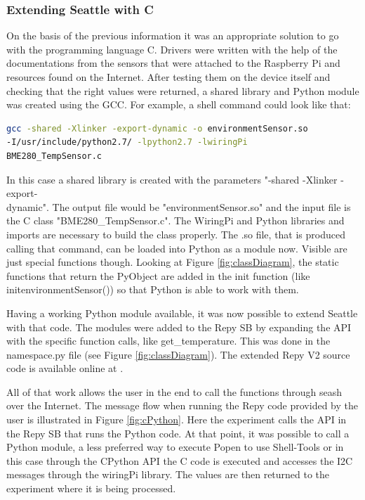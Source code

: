 \documentclass[bachelorthesis, grey, english]{mas-thesis-chapters} %
\begin{document}
\subsubsection{Extending Seattle with C}

On the basis of the previous information it was an appropriate solution to 
go with the programming language C. Drivers were written with the help of the documentations from the sensors that were attached to the Raspberry Pi and resources found on the Internet. After testing them on the device itself and checking that the right values were returned, a shared library and Python module was created using the \gls{GCC}. For example, a shell command could look like that:

\begin{lstlisting}[language=bash,caption={build command for a shared library},captionpos=b]
gcc -shared -Xlinker -export-dynamic -o environmentSensor.so 
-I/usr/include/python2.7/ -lpython2.7 -lwiringPi 
BME280_TempSensor.c
\end{lstlisting}

In this case a shared library is created with the parameters "-shared -Xlinker -export-\\dynamic". The output file would be "environmentSensor.so" and the input file is the C class "BME280\_TempSensor.c". The WiringPi and Python libraries and imports are necessary to build the class properly.
The .so file, that is produced calling that command, can be loaded into Python as a module now. Visible are just special functions though. Looking at Figure \ref{fig:classDiagram}, the static functions that return the PyObject are added in the init function (like initenvironmentSensor()) so that Python is able to work with them.

Having a working Python module available, it was now possible to extend Seattle with that code. The modules were added to the \gls{Repy} \gls{SB} by expanding the \gls{API} with the specific function calls, like get\_temperature. This was done in the namespace.py file (see Figure \ref{fig:classDiagram}). The extended \gls{Repy} V2 source code is available online at \cite{repyFork}.

All of that work allows the user in the end to call the functions through \gls{seash} over the Internet. The message flow when running the \gls{Repy} code provided by the user is illustrated in Figure \ref{fig:cPython}. Here the experiment calls the \gls{API} in the \gls{Repy} \gls{SB} that runs the Python code. At that point, it was possible to call a Python module, a less preferred way to execute Popen to use Shell-Tools or in this case through the CPython \gls{API} the C code is executed and accesses the \gls{I2C} messages through the wiringPi library. The values are then returned to the experiment where it is being processed.
\end{document}
